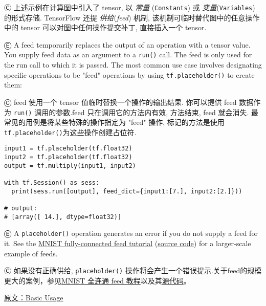 Ⓒ 上述示例在计算图中引入了 tensor, 以 \emph{常量} (\lstinline{Constants}) 或 \emph{变量}(\lstinline{Variables}) 的形式存储. TensorFlow 还提 \emph{供给}(\emph{feed}) 机制, 该机制可临时替代图中的任意操作中的 tensor 可以对图中任何操作提交补丁, 直接插入一个 tensor.

Ⓔ \textcolor{etc}{A feed temporarily replaces the output of an operation with a tensor value. You supply feed data as an argument to a \lstinline{run()} call. The feed is only used for the run call to which it is passed. The most common use case involves designating specific operations to be "feed" operations by using \lstinline{tf.placeholder()} to create them:}

Ⓒ feed 使用一个 tensor 值临时替换一个操作的输出结果. 你可以提供 feed 数据作为 \lstinline {run()} 调用的参数.feed 只在调用它的方法内有效, 方法结束, feed 就会消失. 最常见的用例是将某些特殊的操作指定为 "feed" 操作, 标记的方法是使用\lstinline{tf.placeholder()}为这些操作创建占位符.

\begin{lstlisting}
input1 = tf.placeholder(tf.float32)
input2 = tf.placeholder(tf.float32)
output = tf.multiply(input1, input2)

with tf.Session() as sess:
  print(sess.run([output], feed_dict={input1:[7.], input2:[2.]}))

# output:
# [array([ 14.], dtype=float32)]
\end{lstlisting}

Ⓔ \textcolor{etc}{A \lstinline{placeholder()} operation generates an error if you do not supply a feed for it. See the \hyperref[minist_tf]{MNIST fully-connected feed tutorial} (\href{https://tensorflow.googlesource.com/tensorflow/+/master/tensorflow/g3doc/tutorials/mnist/fully_connected_feed.py}{source code}) for a larger-scale example of feeds.}

Ⓒ 如果没有正确供给, \lstinline{placeholder()} 操作将会产生一个错误提示.关于feed的规模更大的案例，参见\hyperref[minist_tf]{MNIST 全连通 feed 教程}以及其\href{https://tensorflow.googlesource.com/tensorflow/+/master/tensorflow/g3doc/tutorials/mnist/fully_connected_feed.py}{源代码}。

\href{http://tensorflow.org/get_started/basic_usage.md}{原文：Basic Usage}
